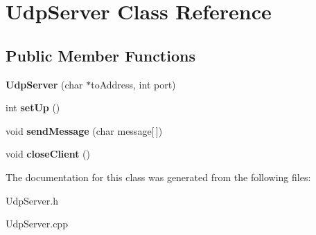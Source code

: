\hypertarget{classUdpServer}{}\section{Udp\+Server Class Reference}
\label{classUdpServer}
\subsection*{Public Member Functions}
\begin{DoxyCompactItemize}
\item 
{\bfseries Udp\+Server} (char $\ast$to\+Address, int port)\hypertarget{classUdpServer_a85b14ce0beffb7955d7c7ce41a1c92b2}{}\label{classUdpServer_a85b14ce0beffb7955d7c7ce41a1c92b2}

\item 
int {\bfseries set\+Up} ()\hypertarget{classUdpServer_a426f4d98cdb26f8be128a996e8bd55dd}{}\label{classUdpServer_a426f4d98cdb26f8be128a996e8bd55dd}

\item 
void {\bfseries send\+Message} (char message\mbox{[}$\,$\mbox{]})\hypertarget{classUdpServer_a77a3a7cbda482a68b7a63787adc519a7}{}\label{classUdpServer_a77a3a7cbda482a68b7a63787adc519a7}

\item 
void {\bfseries close\+Client} ()\hypertarget{classUdpServer_a7eae90fefc0d563ec814426c0f350201}{}\label{classUdpServer_a7eae90fefc0d563ec814426c0f350201}

\end{DoxyCompactItemize}


The documentation for this class was generated from the following files\+:\begin{DoxyCompactItemize}
\item 
Udp\+Server.\+h\item 
Udp\+Server.\+cpp\end{DoxyCompactItemize}

